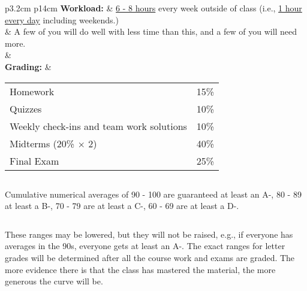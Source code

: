 \documentclass[11pt]{article}
\newcommand{\pl}[1]{\textcolor{Regalia}{\textbf{#1}}}
\begin{document}
\begin{center}
\begin{tabular}{ p{3.2cm} p{14cm} }
\pl{Workload:}			& {\underline{6 - 8 hours}} every week outside of class (i.e.,  {\underline{1 hour every day}} including weekends.)\\
 					& A few of you will do well with less time than this, and a few of you will need more.\\
 					& \\




\pl{Grading:}			&
\begin{tabular}{l l }%
Homework 	& 15\%	\\
Quizzes 	& 10\%	\\
Weekly check-ins and team work solutions & 10\% \\
Midterms (20\% $\times$ 2) 	& 40\%	\\
 Final Exam		& 25\%	
\end{tabular}

$\:$

Cumulative numerical averages of 90 - 100 are guaranteed at least an A-, 80 - 89 at least a B-, 70 - 79 are at least a C-, 60 - 69 are at least a D-.

$\:$

These ranges may be lowered, but they will not be raised, e.g., if everyone has averages in the 90s, everyone gets at least an
A-. The exact ranges for letter grades will be determined after all the course work and exams are graded. The
more evidence there is that the class has mastered the material, the more generous
the curve will be.


\end{tabular}
\end{center}


\end{document}
